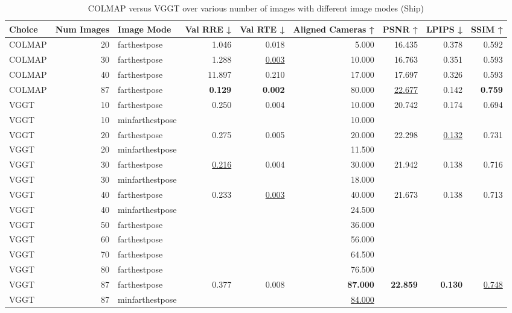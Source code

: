 \begin{table}[H]
\caption{COLMAP versus VGGT over various number of images with different image modes (Ship)}
\label{tab:01_num_images_image_mode_ship}
\centering
\scriptsize
\begin{tabular}{lrlrrrrrr}
\toprule
Choice & Num Images & Image Mode & Val RRE ↓ & Val RTE ↓ & Aligned Cameras ↑ & PSNR ↑ & LPIPS ↓ & SSIM ↑ \\
\midrule
COLMAP & 20 & farthestpose & 1.046 & 0.018 & 5.000 & 16.435 & 0.378 & 0.592 \\
COLMAP & 30 & farthestpose & 1.288 & \underline{0.003} & 10.000 & 16.763 & 0.351 & 0.593 \\
COLMAP & 40 & farthestpose & 11.897 & 0.210 & 17.000 & 17.697 & 0.326 & 0.593 \\
COLMAP & 87 & farthestpose & \textbf{0.129} & \textbf{0.002} & 80.000 & \underline{22.677} & 0.142 & \textbf{0.759} \\
VGGT & 10 & farthestpose & 0.250 & 0.004 & 10.000 & 20.742 & 0.174 & 0.694 \\
VGGT & 10 & minfarthestpose &  &  & 10.000 &  &  &  \\
VGGT & 20 & farthestpose & 0.275 & 0.005 & 20.000 & 22.298 & \underline{0.132} & 0.731 \\
VGGT & 20 & minfarthestpose &  &  & 11.500 &  &  &  \\
VGGT & 30 & farthestpose & \underline{0.216} & 0.004 & 30.000 & 21.942 & 0.138 & 0.716 \\
VGGT & 30 & minfarthestpose &  &  & 18.000 &  &  &  \\
VGGT & 40 & farthestpose & 0.233 & \underline{0.003} & 40.000 & 21.673 & 0.138 & 0.713 \\
VGGT & 40 & minfarthestpose &  &  & 24.500 &  &  &  \\
VGGT & 50 & farthestpose &  &  & 36.000 &  &  &  \\
VGGT & 60 & farthestpose &  &  & 56.000 &  &  &  \\
VGGT & 70 & farthestpose &  &  & 64.500 &  &  &  \\
VGGT & 80 & farthestpose &  &  & 76.500 &  &  &  \\
VGGT & 87 & farthestpose & 0.377 & 0.008 & \textbf{87.000} & \textbf{22.859} & \textbf{0.130} & \underline{0.748} \\
VGGT & 87 & minfarthestpose &  &  & \underline{84.000} &  &  &  \\
\bottomrule
\end{tabular}
\end{table}